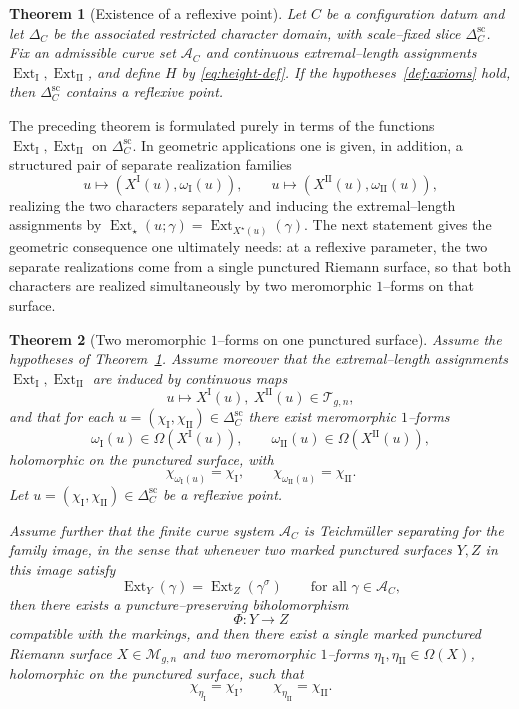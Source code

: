 \documentclass[a4paper,12pt]{amsart}
\DeclareMathOperator{\Ext}{Ext}
\newcommand{\Mgn}{\mathcal{M}_{g,n}}
\theoremstyle{plain}
\newtheorem{theorem}{Theorem}[section]
\theoremstyle{definition}
\begin{document}
\begin{theorem}[Existence of a reflexive point]\label{thm:main}
Let $C$ be a configuration datum and let $\Delta_C$ be the associated restricted character domain, with scale--fixed slice
$\Delta_C^{\mathrm{sc}}$.
Fix an admissible curve set $\mathcal A_C$ and continuous extremal--length assignments $\Ext_{\mathrm{I}},\Ext_{\mathrm{II}}$,
and define $H$ by \eqref{eq:height-def}.
If the  hypotheses~\ref{def:axioms} hold, then $\Delta_C^{\mathrm{sc}}$ contains a reflexive point.
\end{theorem}

The preceding theorem is formulated purely in terms of the functions $\Ext_{\mathrm{I}},\Ext_{\mathrm{II}}$ on
$\Delta_C^{\mathrm{sc}}$.
In geometric applications one is given, in addition, a structured pair of separate realization families
\[
u\longmapsto (X^{\mathrm{I}}(u),\omega_{\mathrm{I}}(u)),\qquad
u\longmapsto (X^{\mathrm{II}}(u),\omega_{\mathrm{II}}(u)),
\]
realizing the two characters separately and inducing the extremal--length assignments by
$\Ext_{\star}(u;\gamma)=\Ext_{X^{\star}(u)}(\gamma)$.
The next statement gives the geometric consequence one ultimately needs: at a reflexive parameter, the two separate
realizations come from a single punctured Riemann surface, so that both characters are realized simultaneously by two
meromorphic $1$--forms on that surface.

\begin{theorem}[Two meromorphic $1$--forms on one punctured surface]\label{thm:twoforms}
Assume the hypotheses of Theorem~\ref{thm:main}.
Assume moreover that the extremal--length assignments $\Ext_{\mathrm{I}},\Ext_{\mathrm{II}}$ are induced by continuous maps
\[
u\longmapsto X^{\mathrm{I}}(u),\ X^{\mathrm{II}}(u)\in\mathcal T_{g,n},
\]
and that for each $u=(\chi_{\mathrm{I}},\chi_{\mathrm{II}})\in\Delta_C^{\mathrm{sc}}$ there exist meromorphic $1$--forms
\[
\omega_{\mathrm{I}}(u)\in\Omega(X^{\mathrm{I}}(u)),\qquad
\omega_{\mathrm{II}}(u)\in\Omega(X^{\mathrm{II}}(u)),
\]
holomorphic on the punctured surface, with
\[
\chi_{\omega_{\mathrm{I}}(u)}=\chi_{\mathrm{I}},\qquad
\chi_{\omega_{\mathrm{II}}(u)}=\chi_{\mathrm{II}}.
\]
Let $u=(\chi_{\mathrm{I}},\chi_{\mathrm{II}})\in\Delta_C^{\mathrm{sc}}$ be a reflexive point.

Assume further that the finite curve system $\mathcal A_C$ is Teichm\"uller separating for the family image, in the sense that
whenever two marked punctured surfaces $Y,Z$ in this image satisfy
\[
\Ext_Y(\gamma)=\Ext_Z(\gamma^\sigma)\qquad\text{for all }\gamma\in\mathcal A_C,
\]
then there exists a puncture--preserving biholomorphism
\[
\Phi:Y\longrightarrow Z
\]
compatible with the markings, and then there exist a single marked punctured Riemann surface $X\in\Mgn$ and two meromorphic $1$--forms
$\eta_{\mathrm{I}},\eta_{\mathrm{II}}\in\Omega(X)$, holomorphic on the punctured surface, such that
\[
\chi_{\eta_{\mathrm{I}}}=\chi_{\mathrm{I}},\qquad \chi_{\eta_{\mathrm{II}}}=\chi_{\mathrm{II}}.
\]
\end{theorem}
\end{document}
